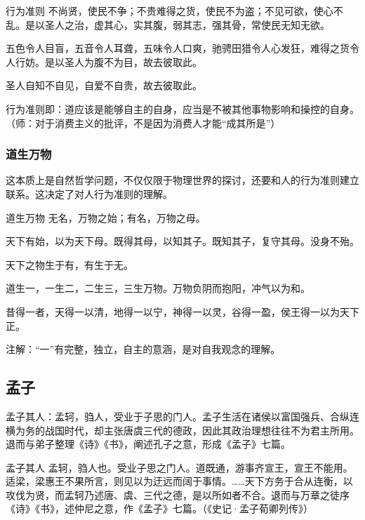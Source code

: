 \begin{fancybox}{行为准则}
    不尚贤，使民不争；不贵难得之货，使民不为盗；不见可欲，使心不乱。是以圣人之治，虚其心，实其腹，弱其志，强其骨，常使民无知无欲。
    
    五色令人目盲，五音令人耳聋，五味令人口爽，驰骋田猎令人心发狂，难得之货令人行妨。是以圣人为腹不为目，故去彼取此。
    
    圣人自知不自见，自爱不自贵，故去彼取此。
\end{fancybox}

行为准则即：道应该是能够自主的自身，应当是不被其他事物影响和操控的自身。（师：对于消费主义的批评，不是因为消费人才能“成其所是”）

\subsubsection{道生万物}

这本质上是自然哲学问题，不仅仅限于物理世界的探讨，还要和人的行为准则建立联系。这决定了对人行为准则的理解。

\begin{fancybox}{道生万物}
    无名，万物之始；有名，万物之母。
    
    天下有始，以为天下母。既得其母，以知其子。既知其子，复守其母。没身不殆。

    天下之物生于有，有生于无。

    道生一，一生二，二生三，三生万物。万物负阴而抱阳，冲气以为和。
       
    昔得一者，天得一以清，地得一以宁，神得一以灵，谷得一盈，侯王得一以为天下正。
\end{fancybox}

注解：“一”有完整，独立，自主的意涵，是对自我观念的理解。

\subsection{孟子}

孟子其人：孟轲，驺人，受业于子思的门人。孟子生活在诸侯以富国强兵、合纵连横为务的战国时代，却主张唐虞三代的德政，因此其政治理想往往不为君主所用。退而与弟子整理《诗》《书》，阐述孔子之意，形成《孟子》七篇。

\begin{fancybox}{孟子其人}
    孟轲，驺人也。受业子思之门人。道既通，游事齐宣王，宣王不能用。适梁，梁惠王不果所言，则见以为迂远而阔于事情。……天下方务于合从连衡，以攻伐为贤，而孟轲乃述唐、虞、三代之德，是以所如者不合。退而与万章之徒序《诗》《书》，述仲尼之意，作《孟子》七篇。（《史记·孟子荀卿列传》）
\end{fancybox}

